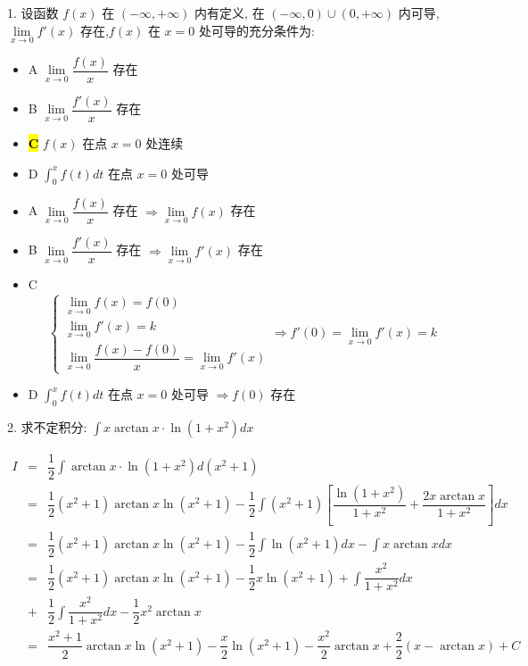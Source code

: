 1. 设函数 $f(x)$ 在 $(-\infty,+\infty)$ 内有定义, 在 $(-\infty,0)\cup(0,+\infty)$ 内可导,
$\lim\limits_{x\rightarrow 0}f'(x)$ 存在,$f(x)$ 在 $x=0$ 处可导的充分条件为:  
\begin{itemize}
	\item A $\lim\limits_{x\rightarrow 0}\dfrac{f(x)}{x}$ 存在
	\item B $\lim\limits_{x\rightarrow 0}\dfrac{f'(x)}{x}$ 存在
	\item \hl{\textbf{C}} $f(x)$ 在点 $x=0$ 处连续
	\item D $\int_{0}^{x}f(t)dt$ 在点 $x=0$ 处可导
\end{itemize}
\begin{solution}
	\begin{itemize}
		\item A $\lim\limits_{x\to 0}\dfrac{f(x)}{x}$ 存在 $\Rightarrow \lim\limits_{x\rightarrow 0}f(x)$ 存在
		\item B $\lim\limits_{x\to 0}\dfrac{f'(x)}{x}$ 存在 $\Rightarrow \lim\limits_{x\rightarrow 0}f'(x)$ 存在
		\item C 
		$$
		\begin{cases}
			\lim\limits_{x\to 0}f(x) = f(0) \\
			\lim\limits_{x\to 0}f'(x) = k\\
		    \lim\limits_{x\to 0}\dfrac{f(x)-f(0)}{x} = \lim\limits_{x\to 0}f'(x)
		\end{cases}
		\Rightarrow f'(0) = \lim\limits_{x\rightarrow 0}f'(x) = k
		$$
		\item D $\int_{0}^{x}f(t)dt$ 在点 $x=0$ 处可导 $\Rightarrow f(0)$ 存在
	\end{itemize}
\end{solution}

2. 求不定积分: $\displaystyle{\int x\arctan x\cdot \ln(1+x^2)dx}$
\begin{solution}

	\begin{eqnarray*}
		I & = & \dfrac{1}{2}\int \arctan x\cdot \ln(1+x^2)d(x^2+1)\\
		  & = & \dfrac{1}{2}(x^2+1)\arctan x\ln(x^2+1)-\dfrac{1}{2}\int (x^{2}+1)\left[\dfrac{\ln(1+x^{2})}{1+x^{2}}+\dfrac{2x\arctan x}{1+x^{2}}\right]dx\\
		  & = & \dfrac{1}{2}(x^2+1)\arctan x\ln(x^2+1)-\dfrac{1}{2}\int \ln(x^2+1)dx-\int x\arctan xdx\\
		  & = & \dfrac{1}{2}(x^2+1)\arctan x\ln(x^2+1)-\dfrac{1}{2}x\ln(x^2+1) + \int \dfrac{x^{2}}{1+x^{2}}dx\\
		  & + & \dfrac{1}{2}\int \dfrac{x^{2}}{1+x^{2}}dx - \dfrac{1}{2}x^2\arctan x\\
		  & = & \dfrac{x^{2}+1}{2}\arctan x\ln(x^{2}+1) -\dfrac{x}{2}\ln(x^{2}+1) - \dfrac{x^{2}}{2}\arctan x +\dfrac{2}{2}(x-\arctan x) + C
	\end{eqnarray*}
\end{solution}

